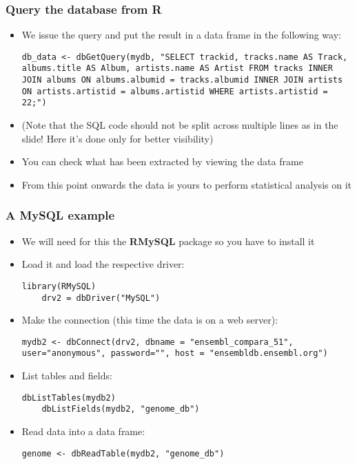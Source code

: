 \documentclass[10pt]{beamer}
\theoremstyle{definition}
\begin{document}
\begin{frame}[fragile]
\frametitle{Query the database from R}
\begin{itemize}
	\item We issue the query and put the result in a data frame in the following way:
	\begin{lstlisting}[style = rstyle, breaklines]
	db_data <- dbGetQuery(mydb, "SELECT	trackid, tracks.name AS Track, albums.title AS Album, artists.name AS Artist FROM tracks INNER JOIN albums ON albums.albumid = tracks.albumid INNER JOIN artists ON artists.artistid = albums.artistid WHERE artists.artistid = 22;")
	\end{lstlisting}
	\item (Note that the SQL code should not be split across multiple lines as in
	the slide! Here it’s done only for better visibility)
	\item You can check what has been extracted by viewing the data frame
	\item From this point onwards the data is yours to perform statistical analysis on it
\end{itemize}
\end{frame}

\begin{frame}[fragile]
\frametitle{A MySQL example}
\begin{itemize}
	\item We will need for this the \textbf{RMySQL} package so you have to install it
	\item Load it and load the respective driver:
	\begin{lstlisting}[style = rstyle, breaklines]
	library(RMySQL)
	drv2 = dbDriver("MySQL")
	\end{lstlisting}
	\item Make the connection (this time the data is on a web server):
	\begin{lstlisting}[style = rstyle, breaklines]
		mydb2 <- dbConnect(drv2, dbname = "ensembl_compara_51", user="anonymous", password="", host = "ensembldb.ensembl.org")
	\end{lstlisting}
	\item List tables and fields:
	\begin{lstlisting}[style = rstyle, breaklines]
	dbListTables(mydb2)
	dbListFields(mydb2, "genome_db")
	\end{lstlisting}
	\item Read data into a data frame:
	\begin{lstlisting}[style = rstyle, breaklines]
	genome <- dbReadTable(mydb2, "genome_db")		
	\end{lstlisting}
\end{itemize}
\end{frame}
\end{document}
